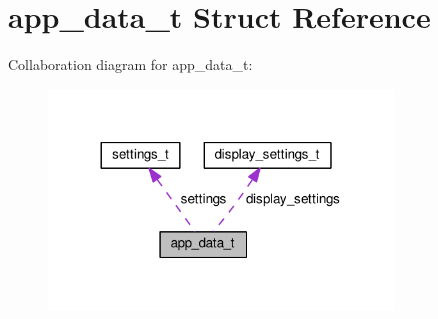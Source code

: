 \hypertarget{structapp__data__t}{}\section{app\+\_\+data\+\_\+t Struct Reference}
\label{structapp__data__t}


Collaboration diagram for app\+\_\+data\+\_\+t\+:\nopagebreak
\begin{figure}[H]
\begin{center}
\leavevmode
\includegraphics[width=260pt]{structapp__data__t__coll__graph}
\end{center}
\end{figure}
